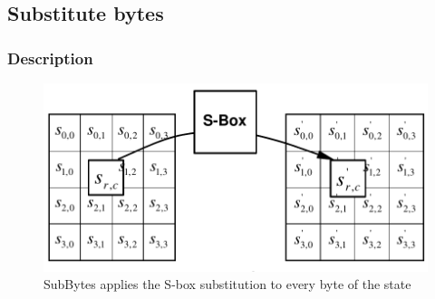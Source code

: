 \hypertarget{substitute-bytes}{%
\subsection{Substitute bytes}\label{substitute-bytes}}

\hypertarget{description-5}{%
\subsubsection{Description}\label{description-5}}

\begin{figure}
\centering
\includegraphics[scale = 0.3]{data/figures/subbytes.png}
\caption{SubBytes applies the S-box substitution to every byte of the
state}
\end{figure}

